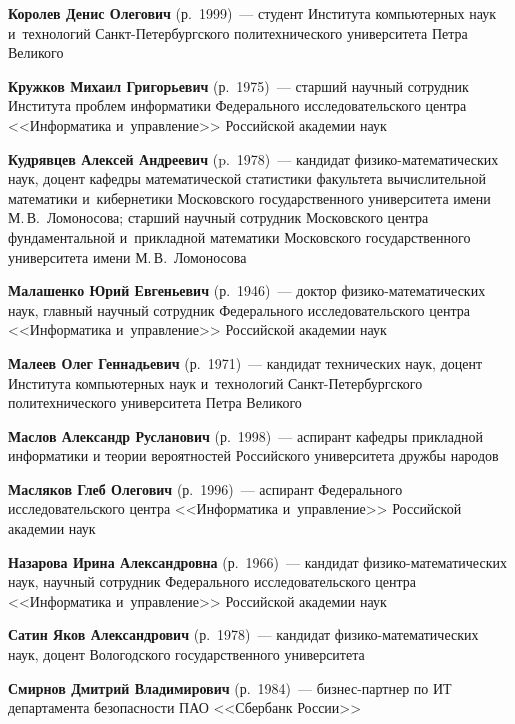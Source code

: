 \begin{multicols}{2}
\noindent
\textbf{Королев Денис Олегович} (р.\ 1999)~--- студент Института компьютерных наук и~технологий Санкт-Пе\-тер\-бург\-ско\-го 
политехнического университета Пет\-ра Великого

\noindent
\textbf{Кружков Михаил Григорьевич} (р.\ 1975)~--- 
старший научный сотрудник Института проб\-лем информатики Федерального исследовательского цент\-ра <<Информатика и~управ\-ле\-ние>>
 Российской академии наук
 
 \noindent
\textbf{Кудрявцев Алексей Андреевич} (p.\ 1978)~--- 
кандидат фи\-зи\-ко-ма\-те\-ма\-ти\-че\-ских наук, доцент кафедры математической 
статистики факультета вы\-чис\-ли\-тель\-ной математики и~кибернетики Московского государственного 
университета имени М.\,В.~Ломоносова; старший научный со\-труд\-ник Московского цент\-ра 
фундаментальной и~при\-клад\-ной математики Московского государственного университета имени М.\,В.~Ломоносова

\vspace*{2pt}


\noindent
\textbf{Малашенко Юрий Евгеньевич} (р.\ 1946)~--- доктор фи\-зи\-ко-ма\-те\-ма\-ти\-че\-ских наук, 
главный научный сотрудник Федерального исследовательского цент\-ра <<Информатика и~управ\-ле\-ние>> Российской академии наук


\noindent
\textbf{Малеев Олег Геннадьевич} (р.\ 1971)~--- 
кандидат технических наук, доцент Института компьютерных наук и~технологий Санкт-Пе\-тер\-бург\-ско\-го политехнического университета Пет\-ра Великого

\noindent
\textbf{Маслов Александр Русланович} (р.\ 1998)~--- аспирант ка\-фед\-ры при\-клад\-ной информатики и теории вероятностей Российского университета друж\-бы на\-родов

\noindent
\textbf{Масляков Глеб Олегович} (р.\ 1996)~--- аспирант Федерального исследовательского цент\-ра <<Информатика и~управ\-ле\-ние>> Российской академии наук

\noindent
\textbf{Назарова Ирина Александровна} (р.\ 1966)~--- кандидат фи\-зи\-ко-ма\-те\-ма\-ти\-че\-ских наук, 
научный сотрудник Федерального исследовательского цент\-ра <<Информатика и~управ\-ле\-ние>> Российской академии наук

\noindent
\textbf{Сатин Яков Александрович} (р.\ 1978)~--- кандидат фи\-зи\-ко-ма\-те\-ма\-ти\-че\-ских наук,
доцент  Вологодского государственного университета

\noindent
\textbf{Смирнов Дмитрий Владимирович} (р.\ 1984)~--- биз\-нес-парт\-нер по ИТ департамента безопас\-ности ПАО <<Сбербанк России>>


\end{multicols}
